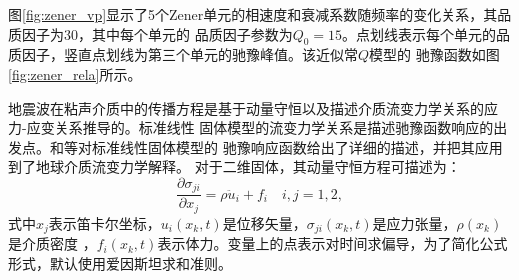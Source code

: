 图\ref{fig:zener_vp}显示了5个Zener单元的相速度和衰减系数随频率的变化关系，其品质因子为30，其中每个单元的
品质因子参数为$Q_0=15$。点划线表示每个单元的品质因子，竖直点划线为第三个单元的驰豫峰值。该近似常$Q$模型的
驰豫函数如图\ref{fig:zener_rela}所示。

地震波在粘声介质中的传播方程是基于动量守恒以及描述介质流变力学关系的应力-应变关系推导的。标准线性
固体模型的流变力学关系是描述驰豫函数响应的出发点。和等对标准线性固体模型的
驰豫响应函数给出了详细的描述，并把其应用到了地球介质流变力学解释。
对于二维固体，其动量守恒方程可描述为：
\begin{equation}
	\frac{\partial\sigma_{ji}}{\partial x_j}=\rho\ddot{u}_i+f_i \quad i,j=1,2,
	\label{eq:dl}
\end{equation}
式中$x_j$表示笛卡尔坐标，$u_i(x_k,t)$是位移矢量，$\sigma_{ji}(x_k,t)$是应力张量，$\rho(x_k)$是介质密度
，$f_i(x_k,t)$表示体力。变量上的点表示对时间求偏导，为了简化公式形式，默认使用爱因斯坦求和准则。

